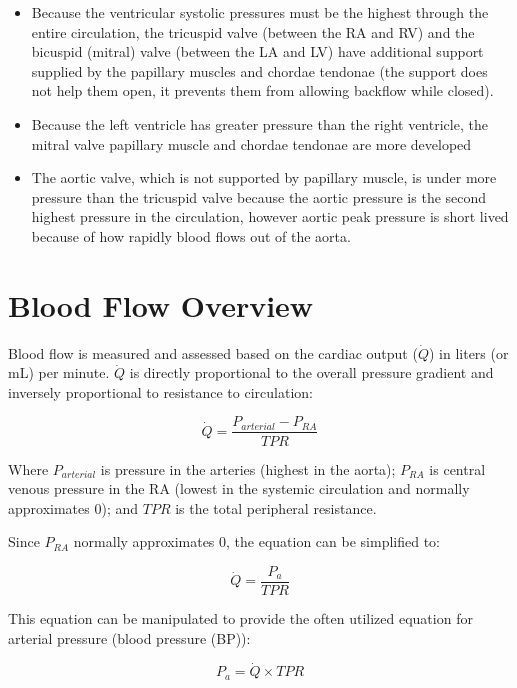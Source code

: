 \begin{itemize}
    \item Because the ventricular systolic pressures must be the highest through the entire circulation, the tricuspid valve (between the RA and RV) and the bicuspid (mitral) valve (between the LA and LV) have additional support supplied by the papillary muscles and chordae tendonae (the support does not help them open, it prevents them from allowing backflow while closed).
    \item Because the left ventricle has greater pressure than the right ventricle, the mitral valve papillary muscle and chordae tendonae are more developed
    \item The aortic valve, which is not supported by papillary muscle, is under more pressure than the tricuspid valve because the aortic pressure is the second highest pressure in the circulation, however aortic peak pressure is short lived because of how rapidly blood flows out of the aorta.
\end{itemize}

\section{Blood Flow Overview}

Blood flow is measured and assessed based on the cardiac output ($\dot{Q}$) in liters (or mL) per minute. $\dot{Q}$ is directly proportional to the overall pressure gradient and inversely proportional to resistance to circulation:

\begin{equation}
    \dot{Q} = \frac{P_{arterial} - P_{RA}}{TPR}
    \label{Q}
\end{equation}

Where $P_{arterial}$ is pressure in the arteries (highest in the aorta); $P_{RA}$ is central venous pressure in the RA (lowest in the systemic circulation and normally approximates 0); and $TPR$ is the total peripheral resistance.

Since $P_{RA}$ normally approximates 0, the equation can be simplified to:

\begin{equation}
    \dot{Q} = \frac{P_{a}}{TPR}
    \label{Q_simplified}
\end{equation}

This equation can be manipulated to provide the often utilized equation for arterial pressure (blood pressure (BP)):

\begin{equation}
    P_{a} = \dot{Q} \times TPR
    \label{BP}
\end{equation}

